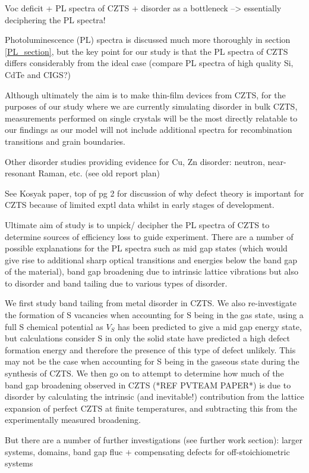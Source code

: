 Voc deficit + PL spectra of CZTS + disorder as a bottleneck --> essentially deciphering the PL spectra!
 
Photoluminescence (PL) spectra is discussed much more thoroughly in section \ref{PL_section}, but the key point for our study is that the PL spectra of CZTS differs considerably from the ideal case
(compare PL spectra of high quality Si, CdTe and CIGS?)

Although ultimately the aim is to make thin-film devices from CZTS, for the purposes of our study where we are currently simulating disorder in bulk CZTS, measurements performed on single crystals will be the most directly relatable to our findings as our model will not include additional spectra for recombination transitions and grain boundaries.

Other disorder studies providing evidence for Cu, Zn disorder: neutron, near-resonant Raman, etc. (see old report plan)

See Kosyak paper, top of pg 2 for discussion of why defect theory is important for CZTS because of limited exptl data whilst in early stages of development.

Ultimate aim of study is to unpick/ decipher the PL spectra of CZTS to determine sources of efficiency loss to guide experiment. There are a number of possible explanations for the PL spectra such as mid gap states (which would give rise to additional sharp optical transitions and energies below the band gap of the material),  band gap broadening due to intrinsic lattice vibrations but also to disorder and band tailing due to various types of disorder.

We first study band tailing from metal disorder in CZTS. We also re-investigate the formation of S vacancies when accounting for S being in the gas state, using a full S chemical potential as $V_S$ has been predicted to give a mid gap energy state, but calculations consider S in only the solid state have predicted a high defect formation energy and therefore the presence of this type of defect unlikely. This may not be the case when accounting for S being in the gaseous state during the synthesis of CZTS.
We then go on to attempt to determine how much of the band gap broadening observed in CZTS (*REF PVTEAM PAPER*) is due to disorder by calculating the intrinsic (and inevitable!) contribution from the lattice expansion of perfect CZTS at finite temperatures, and subtracting this from the experimentally measured broadening.
 
But there are a number of further investigations (see further work section): larger systems, domains, band gap fluc + compensating defects for off-stoichiometric systems


